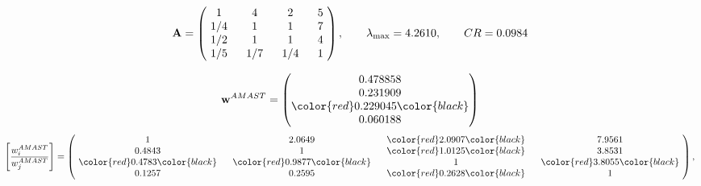 \begin{example}
\begin{equation*}
\mathbf{A} =
\begin{pmatrix}
$\,\,$ 1 $\,\,$ & $\,\,$4$\,\,$ & $\,\,$2$\,\,$ & $\,\,$5 $\,\,$ \\
$\,\,$ 1/4$\,\,$ & $\,\,$ 1 $\,\,$ & $\,\,$1$\,\,$ & $\,\,$7 $\,\,$ \\
$\,\,$ 1/2$\,\,$ & $\,\,$ 1 $\,\,$ & $\,\,$ 1 $\,\,$ & $\,\,$4 $\,\,$ \\
$\,\,$ 1/5$\,\,$ & $\,\,$ 1/7$\,\,$ & $\,\,$ 1/4$\,\,$ & $\,\,$ 1  $\,\,$ \\
\end{pmatrix},
\qquad
\lambda_{\max} =
4.2610,
\qquad
CR = 0.0984
\end{equation*}

\begin{equation*}
\mathbf{w}^{AMAST} =
\begin{pmatrix}
0.478858\\
0.231909\\
\color{red} 0.229045\color{black} \\
0.060188
\end{pmatrix}\end{equation*}
\begin{equation*}
\left[ \frac{{w}^{AMAST}_i}{{w}^{AMAST}_j} \right] =
\begin{pmatrix}
$\,\,$ 1 $\,\,$ & $\,\,$2.0649$\,\,$ & $\,\,$\color{red} 2.0907\color{black} $\,\,$ & $\,\,$7.9561$\,\,$ \\
$\,\,$0.4843$\,\,$ & $\,\,$ 1 $\,\,$ & $\,\,$\color{red} 1.0125\color{black} $\,\,$ & $\,\,$3.8531  $\,\,$ \\
$\,\,$\color{red} 0.4783\color{black} $\,\,$ & $\,\,$\color{red} 0.9877\color{black} $\,\,$ & $\,\,$ 1 $\,\,$ & $\,\,$\color{red} 3.8055\color{black}  $\,\,$ \\
$\,\,$0.1257$\,\,$ & $\,\,$0.2595$\,\,$ & $\,\,$\color{red} 0.2628\color{black} $\,\,$ & $\,\,$ 1  $\,\,$ \\
\end{pmatrix},
\end{equation*}


\end{example}
